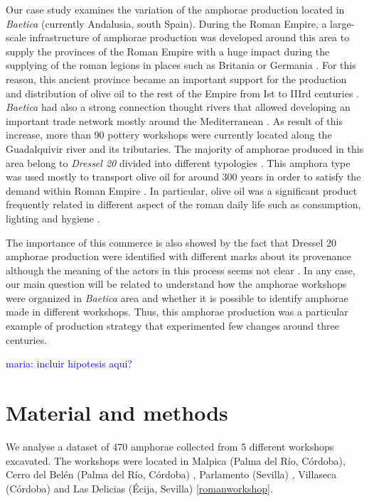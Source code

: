 \documentclass[review]{elsarticle}
\newcommand{\memo}[2]{\textcolor{#1}{#2}}
\newcommand{\maria}[1]{\memo{blue}{maria: #1\\}}
\begin{document}
Our case study examines the variation of the amphorae production located in \emph{Baetica} (currently Andalusia, south Spain). During the Roman Empire, a large-scale infrastructure of amphorae production was developed around this area to supply the provinces of the Roman Empire with a huge impact during the supplying of the roman legions in places such as Britania \citep{funari_economic_2005, monfort_britannia_1998} or Germania \citep{remesal_annona_1986}. For this reason, this ancient province became an important support for the production and distribution of olive oil to the rest of the Empire from Ist to IIIrd centuries \cite{chic_comercio_2005,millet_anforas_1998, rodriguez_baetican_1998}. \emph{Baetica} had also a strong connection thought rivers that allowed developing an important trade network mostly around the Mediterranean \citep{garcia_vargas_enrique_formal_2010}. As result of this increase, more than 90 pottery workshops were currently located along the Guadalquivir river and its tributaries. The majority of amphorae produced in this area belong to \emph{Dressel 20} divided into different typologies \citep{berni_millet_epigrafianforica_2008, martin-kilcher_romischen_1994}. This amphora type was used mostly to transport olive oil for around 300 years in order to satisfy the demand within Roman Empire \citep{rodriguez_economioleicola_1977}. In particular, olive oil was a significant product frequently related in different aspect of the roman daily life such as consumption, lighting and hygiene \citep{mattingly_d.j._oil_1988}. 

The importance of this commerce is also showed by the fact that Dressel 20 amphorae production were identified with different marks about its provenance although the meaning of the actors in this process seems not clear \citep{coto-sarmiento_maria_bayesian_????}. In any case, our main question will be related to understand how the amphorae workshops were organized in \textit{Baetica} area and whether it is possible to identify amphorae made in different workshops. 
Thus, this amphorae production was a particular example of production strategy that experimented few changes around three centuries.   

\maria{incluir hipotesis aqui?}

\section{Material and methods}

We analyse a dataset of 470 amphorae collected from 5 different workshops excavated. The workshops were located in Malpica (Palma del R\'io, C\'ordoba), Cerro del Bel\'en (Palma del R\'io, C\'ordoba) \citep{diaz_trujillo_excavacion_1992}, Parlamento (Sevilla) \citep{garcia_vargas_anforas_2000}, Villaseca (C\'ordoba)\citep{garcia_vargas_enrique_excavacion_????} and Las Delicias (\'Ecija, Sevilla) \citep{fernandez_excavacion_2001,_atelier_2014} \ref{romanworkshop}. 
\end{document}
